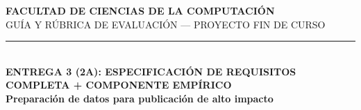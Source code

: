 \documentclass[11pt,a4paper]{article}
\begin{document}
\begin{center}
    {\large\bfseries\color{secdark}FACULTAD DE CIENCIAS DE LA COMPUTACIÓN}\\[2pt]
    {\small\color{secdark}GUÍA Y RÚBRICA DE EVALUACIÓN --- PROYECTO FIN DE CURSO}\\[4pt]
    \textcolor{uteqgold}{\rule{0.7\textwidth}{1.4pt}}\\[8pt]
    {\LARGE\bfseries\color{uteqgreen}ENTREGA 3 (2A): ESPECIFICACIÓN DE REQUISITOS}\\[2pt]
    {\LARGE\bfseries\color{uteqgreen}COMPLETA + COMPONENTE EMPÍRICO}\\[6pt]
    {\normalsize\bfseries\color{purpleimpact}Preparación de datos para publicación de alto impacto}\\[6pt]
\end{center}
\end{document}
